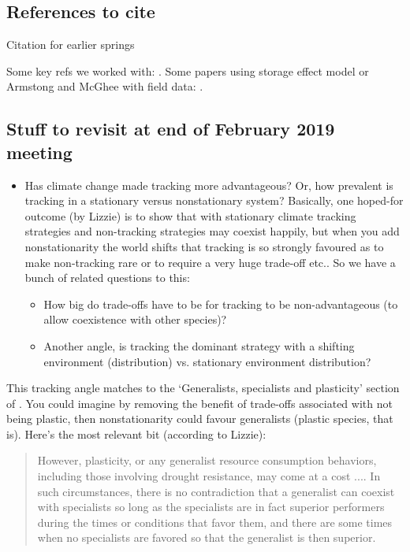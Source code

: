 \documentclass[11pt,letterpaper]{article}
\begin{document}
\subsection{References to cite}
\noindent Citation for earlier springs %

\noindent Some key refs we worked with:
\citep{Chesson:1993gi,Chesson:2000ak,Chesson:2000vd,Chesson:2004eo}. Some
papers using storage effect model or Armstong and McGhee with field
data: \citep{Angert:2009,Kuang:2008ri,Kuang:2009rj,Levine:2009ym}.



\subsection{Stuff to revisit at end of February 2019 meeting}
\begin{itemize}
\item Has climate change made tracking more advantageous? Or, how prevalent is tracking in a stationary versus nonstationary system? Basically, one hoped-for outcome (by Lizzie) is to show that with stationary climate tracking strategies and non-tracking strategies may coexist happily, but when you add nonstationarity the world shifts that tracking is so strongly favoured as to make non-tracking rare or to require a very huge trade-off etc.. So we have a bunch of related questions to this:
\begin{itemize}
\item How big do trade-offs have to be for tracking to be non-advantageous (to allow coexistence with other species)?
\item Another angle, is tracking the dominant strategy with a shifting environment (distribution) vs. stationary environment distribution?
\end{itemize}
\end{itemize}


\noindent This tracking angle matches to the `Generalists, specialists and plasticity' section of \citet{Chesson:2004eo}. You could imagine by removing the benefit of trade-offs associated with not being plastic, then nonstationarity could favour generalists (plastic species, that is). Here's the most relevant bit (according to Lizzie):
\begin{quote}
However, plasticity, or any generalist resource consumption
behaviors, including those involving drought resistance,
may come at a cost .... In such circumstances, there is no
contradiction that a generalist can coexist with specialists
so long as the specialists are in fact superior performers
during the times or conditions that favor them, and there 
are some times when no specialists are favored so that the
generalist is then superior.
\end{quote}
\end{document}
